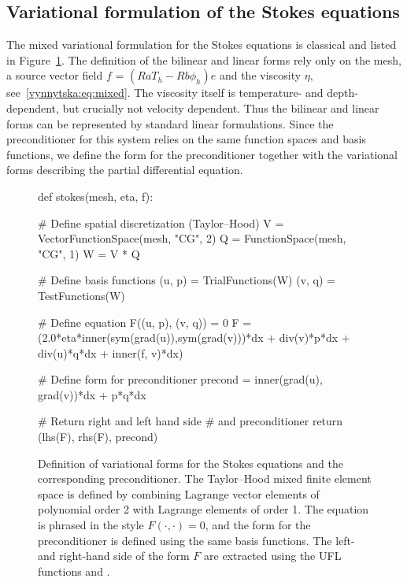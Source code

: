 \subsection{Variational formulation of the Stokes equations}

The mixed variational formulation for the Stokes equations is
classical and listed in Figure~\ref{vynnytska:fig:stokes}. The
definition of the bilinear and linear forms rely only on the mesh, a
source vector field $f$ = $(Ra T_h - Rb \phi_h) e$ and the viscosity
$\eta$, see~\eqref{vynnytska:eq:mixed}.  The viscosity itself is
temperature- and depth-dependent, but crucially not velocity
dependent.  Thus the bilinear and linear forms can be represented by
standard linear formulations.  Since the preconditioner for this
system relies on the same function spaces and basis functions, we
define the form for the preconditioner together with the variational
forms describing the partial differential equation.
\begin{figure}
  \begin{python}
def stokes(mesh, eta, f):

    # Define spatial discretization (Taylor--Hood)
    V = VectorFunctionSpace(mesh, "CG", 2)
    Q = FunctionSpace(mesh, "CG", 1)
    W = V * Q

    # Define basis functions
    (u, p) = TrialFunctions(W)
    (v, q) = TestFunctions(W)

    # Define equation F((u, p), (v, q)) = 0
    F = (2.0*eta*inner(sym(grad(u)),sym(grad(v)))*dx
         + div(v)*p*dx
         + div(u)*q*dx
         + inner(f, v)*dx)

    # Define form for preconditioner
    precond = inner(grad(u), grad(v))*dx + p*q*dx

    # Return right and left hand side
    # and preconditioner
    return (lhs(F), rhs(F), precond)
  \end{python}

  \caption{Definition of variational forms for the Stokes equations
    and the corresponding preconditioner. The Taylor--Hood mixed
    finite element space is defined by combining Lagrange vector
    elements of polynomial order 2 with Lagrange elements of order
    1. The equation is phrased in the style $F(\cdot, \cdot) = 0$, and
    the form for the preconditioner is defined using the same basis
    functions. The left- and right-hand side of the form $F$ are
    extracted using the UFL functions 
    and .}
  \label{vynnytska:fig:stokes}
\end{figure}


